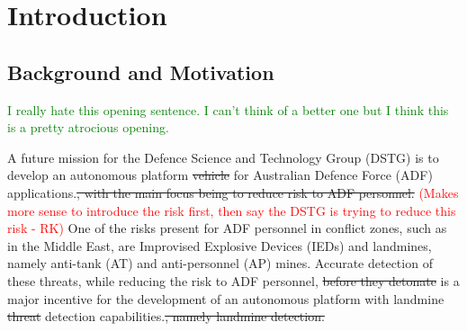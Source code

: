 \documentclass[main.tex]{subfiles}
\begin{document}

\chapter{Introduction}

\section{Background and Motivation}
\textcolor{green}{I really hate this opening sentence. I can't think of a better one but I think this is a pretty atrocious opening.}

A future mission for the Defence Science and Technology Group (DSTG) is to develop an autonomous platform \sout{vehicle} for Australian Defence Force (ADF) applications.\sout{, with the main focus being to reduce risk to ADF personnel.} 
\textcolor{red}{(Makes more sense to introduce the risk first, then say the DSTG is trying to reduce this risk - RK)} 
One of the risks present for ADF personnel in conflict zones, such as in the Middle East, are Improvised Explosive Devices (IEDs) and landmines, namely anti-tank (AT) and anti-personnel (AP) mines. Accurate detection of these threats, while reducing the risk to ADF personnel, \sout{before they detonate} is a major incentive for the development of an autonomous platform with landmine \sout{threat} detection capabilities.\sout{, namely landmine detection.}
\\
% 
% 
%
%
%
\end{document}
